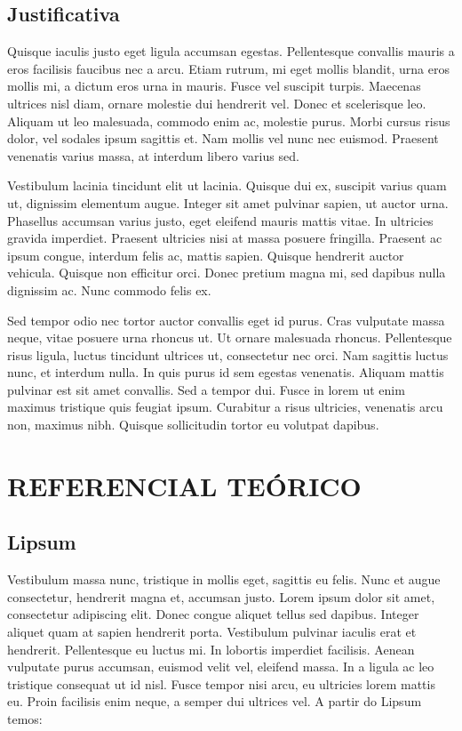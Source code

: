 \documentclass[
	12pt,				%
	a4paper,			%
    openany,
    oneside,
	english,			%
	french,				%
	spanish,			%
	brazil,				%
	]{abntex2}
\begin{document}
\section{Justificativa}

 Quisque iaculis justo eget ligula accumsan egestas. Pellentesque convallis mauris a eros facilisis faucibus nec a arcu. Etiam rutrum, mi eget mollis blandit, urna eros mollis mi, a dictum eros urna in mauris. Fusce vel suscipit turpis. Maecenas ultrices nisl diam, ornare molestie dui hendrerit vel. Donec et scelerisque leo. Aliquam ut leo malesuada, commodo enim ac, molestie purus. Morbi cursus risus dolor, vel sodales ipsum sagittis et. Nam mollis vel nunc nec euismod. Praesent venenatis varius massa, at interdum libero varius sed.

Vestibulum lacinia tincidunt elit ut lacinia. Quisque dui ex, suscipit varius quam ut, dignissim elementum augue. Integer sit amet pulvinar sapien, ut auctor urna. Phasellus accumsan varius justo, eget eleifend mauris mattis vitae. In ultricies gravida imperdiet. Praesent ultricies nisi at massa posuere fringilla. Praesent ac ipsum congue, interdum felis ac, mattis sapien. Quisque hendrerit auctor vehicula. Quisque non efficitur orci. Donec pretium magna mi, sed dapibus nulla dignissim ac. Nunc commodo felis ex.

Sed tempor odio nec tortor auctor convallis eget id purus. Cras vulputate massa neque, vitae posuere urna rhoncus ut. Ut ornare malesuada rhoncus. Pellentesque risus ligula, luctus tincidunt ultrices ut, consectetur nec orci. Nam sagittis luctus nunc, et interdum nulla. In quis purus id sem egestas venenatis. Aliquam mattis pulvinar est sit amet convallis. Sed a tempor dui. Fusce in lorem ut enim maximus tristique quis feugiat ipsum. Curabitur a risus ultricies, venenatis arcu non, maximus nibh. Quisque sollicitudin tortor eu volutpat dapibus. 

\chapter{REFERENCIAL TEÓRICO}

\section{Lipsum}

 Vestibulum massa nunc, tristique in mollis eget, sagittis eu felis. Nunc et augue consectetur, hendrerit magna et, accumsan justo. Lorem ipsum dolor sit amet, consectetur adipiscing elit. Donec congue aliquet tellus sed dapibus. Integer aliquet quam at sapien hendrerit porta. Vestibulum pulvinar iaculis erat et hendrerit. Pellentesque eu luctus mi. In lobortis imperdiet facilisis. Aenean vulputate purus accumsan, euismod velit vel, eleifend massa. In a ligula ac leo tristique consequat ut id nisl. Fusce tempor nisi arcu, eu ultricies lorem mattis eu. Proin facilisis enim neque, a semper dui ultrices vel. A partir do Lipsum temos:
\end{document}
